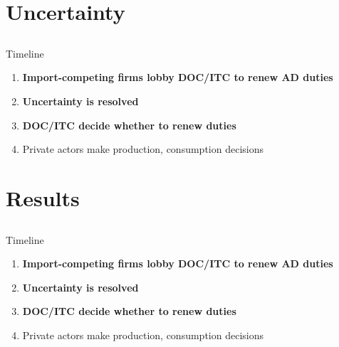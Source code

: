 \documentclass[handout]{beamer}
\begin{document}
\section{Uncertainty}
\subsection{}
\begin{frame}{Timeline}
\begin{enumerate}[<+->]
	\item \textbf{Import-competing firms lobby DOC/ITC to renew AD duties}
	\item {\color{gray} \textbf{Uncertainty is resolved}}
	\item \textbf{DOC/ITC decide whether to renew duties}
	\item {\color{gray} Private actors make production, consumption decisions}
\end{enumerate}
	
\end{frame}



\section{Results}
\subsection{}
\begin{frame}{Timeline}
\begin{enumerate}[<+->]
	\item \textbf{Import-competing firms lobby DOC/ITC to renew AD duties}
	\item \textbf{Uncertainty is resolved}
	\item \textbf{DOC/ITC decide whether to renew duties}
	\item Private actors make production, consumption decisions
\end{enumerate}
\end{frame}
\end{document}
